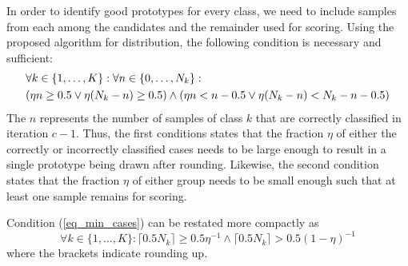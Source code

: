 %
In order to identify good prototypes for every class, we need to include samples from each among the candidates and the remainder used for scoring. Using the proposed algorithm for distribution, the following condition is necessary and sufficient:
%
\begin{align}
&\forall k\in\{1,\dots,K\}:\forall n\in\{0,\dots,N_k\}:\label{eq_min_cases}\\
&(\eta n\geq0.5\vee\eta(N_k-n)\geq0.5)\wedge(\eta n<n-0.5\vee\eta(N_k-n)<N_k-n-0.5)\notag
\end{align}
%
The $n$ represents the number of samples of class $k$ that are correctly classified in iteration $c-1$.
Thus, the first conditions states that the fraction $\eta$ of either the correctly or incorrectly classified cases needs to be large enough to result in a single prototype being drawn after rounding.
Likewise, the second condition states that the fraction $\eta$ of either group needs to be small enough such that at least one sample remains for scoring.\par
%
\begin{lemma}
Condition (\ref{eq_min_cases}) can be restated more compactly as
%
\begin{equation}
\forall k\in\{1,\dots,K\}:\lceil0.5N_k\rceil\geq0.5\eta^{-1}\wedge\lceil0.5N_k\rceil>0.5(1-\eta)^{-1}\label{eq_min_cases_2}
\end{equation}
%
where the brackets indicate rounding up.
\end{lemma}
%
